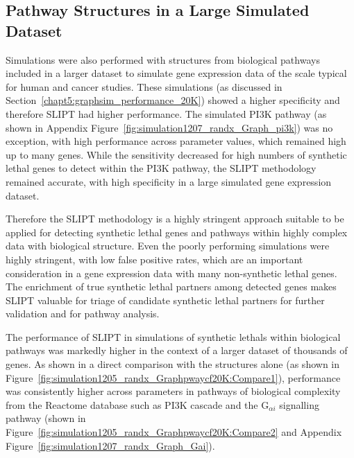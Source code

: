 \FloatBarrier

\subsection{Pathway Structures in a Large Simulated Dataset}
\label{chapt5:graphsim_performance_20K_pway}
\FloatBarrier

Simulations were also performed with  structures from biological pathways included in a larger dataset to simulate \gls{gene expression} data of the scale typical for human and cancer studies. These simulations (as discussed in Section~\ref{chapt5:graphsim_performance_20K}) showed a higher specificity and therefore \gls{SLIPT} had higher performance. The simulated PI3K pathway (as shown in Appendix Figure~\ref{fig:simulation1207_randx_Graph_pi3k}) was no exception, with high performance across parameter values, which remained high up to many genes. While the sensitivity decreased for high numbers of \gls{synthetic lethal} genes to detect within the PI3K pathway, the \gls{SLIPT} methodology remained accurate, with high specificity in a large simulated \gls{gene expression} dataset. 


Therefore the \gls{SLIPT} methodology is a highly stringent approach suitable to be applied for detecting \gls{synthetic lethal} genes and pathways within highly complex  data with biological  structure.  Even the poorly performing simulations were highly stringent, with low false positive rates, which are an important consideration in a \gls{gene expression} data with many non-synthetic lethal genes. The enrichment of true \gls{synthetic lethal} partners among detected genes makes \gls{SLIPT} valuable for triage of candidate \gls{synthetic lethal} partners for further validation and for pathway analysis.

The performance of \gls{SLIPT} in simulations of \glspl{synthetic lethal} within biological pathways was markedly higher in the context of a larger dataset of thousands of genes. As shown in a direct comparison with the  structures alone (as shown in Figure~\ref{fig:simulation1205_randx_Graphpwaycf20K:Compare1}), performance was consistently higher across parameters in pathways of biological complexity from the Reactome database \citep{Reactome} such as PI3K cascade and the G$_{\alpha i}$ signalling pathway (shown in Figure~\ref{fig:simulation1205_randx_Graphpwaycf20K:Compare2} and Appendix Figure~\ref{fig:simulation1207_randx_Graph_Gai}). 

